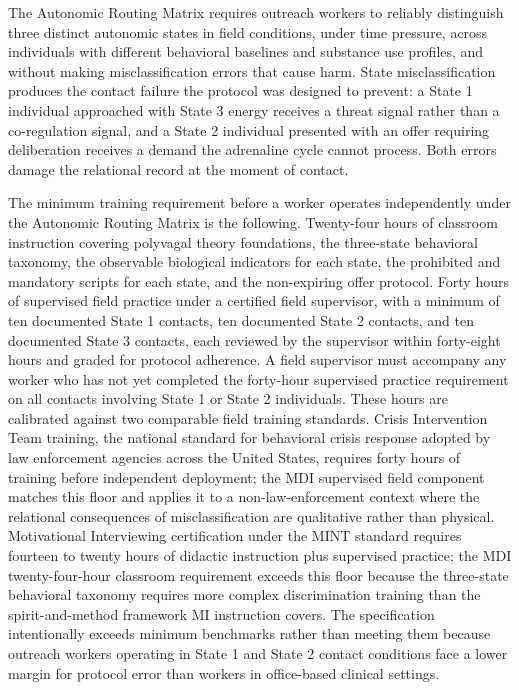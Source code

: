 \documentclass[12pt, letterpaper]{article}
\begin{document}
The Autonomic Routing Matrix requires outreach workers to reliably distinguish three distinct autonomic states in field conditions, under time pressure, across individuals with different behavioral baselines and substance use profiles, and without making misclassification errors that cause harm. State misclassification produces the contact failure the protocol was designed to prevent: a State 1 individual approached with State 3 energy receives a threat signal rather than a co-regulation signal, and a State 2 individual presented with an offer requiring deliberation receives a demand the adrenaline cycle cannot process. Both errors damage the relational record at the moment of contact.

The minimum training requirement before a worker operates independently under the Autonomic Routing Matrix is the following. Twenty-four hours of classroom instruction covering polyvagal theory foundations, the three-state behavioral taxonomy, the observable biological indicators for each state, the prohibited and mandatory scripts for each state, and the non-expiring offer protocol. Forty hours of supervised field practice under a certified field supervisor, with a minimum of ten documented State 1 contacts, ten documented State 2 contacts, and ten documented State 3 contacts, each reviewed by the supervisor within forty-eight hours and graded for protocol adherence. A field supervisor must accompany any worker who has not yet completed the forty-hour supervised practice requirement on all contacts involving State 1 or State 2 individuals. These hours are calibrated against two comparable field training standards. Crisis Intervention Team training, the national standard for behavioral crisis response adopted by law enforcement agencies across the United States, requires forty hours of training before independent deployment; the MDI supervised field component matches this floor and applies it to a non-law-enforcement context where the relational consequences of misclassification are qualitative rather than physical. Motivational Interviewing certification under the MINT standard requires fourteen to twenty hours of didactic instruction plus supervised practice; the MDI twenty-four-hour classroom requirement exceeds this floor because the three-state behavioral taxonomy requires more complex discrimination training than the spirit-and-method framework MI instruction covers. The specification intentionally exceeds minimum benchmarks rather than meeting them because outreach workers operating in State 1 and State 2 contact conditions face a lower margin for protocol error than workers in office-based clinical settings.
\end{document}
